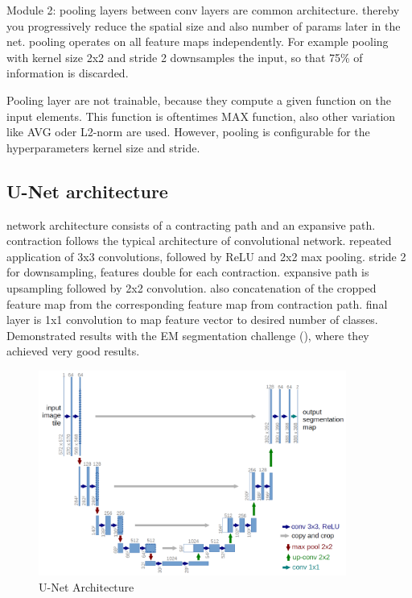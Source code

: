 \cite{stanford_convnet}
Module 2: pooling layers between conv layers are common architecture. thereby you progressively reduce the spatial size and also number of params later in the net. pooling operates on all feature maps independently. For example pooling with kernel size 2x2 and stride 2 downsamples the input, so that 75\% of information is discarded.

Pooling layer are not trainable, because they compute a given function on the input elements. This function is oftentimes MAX function, also other variation like AVG oder L2-norm are used. However, pooling is configurable for the hyperparameters kernel size and stride.

\subsection{U-Net architecture}
\cite{unet15}
network architecture consists of a contracting path and an expansive path. contraction follows the typical architecture of convolutional network. repeated application of 3x3 convolutions, followed by ReLU and 2x2 max pooling. stride 2 for downsampling, features double for each contraction.
expansive path is upsampling followed by 2x2 convolution. also concatenation of the cropped feature map from the corresponding feature map from contraction path.
final layer is 1x1 convolution to map feature vector to desired number of classes. Demonstrated results with the EM segmentation challenge (\cite{isbi_challenge}), where they achieved very good results.

\begin{figure}[h]
    \centering
    \includegraphics[width=0.9\textwidth]{images/u-net-architecture}
    \caption{U-Net Architecture \cite{unet15}}
    \label{fig:unet_architecture}
\end{figure}


